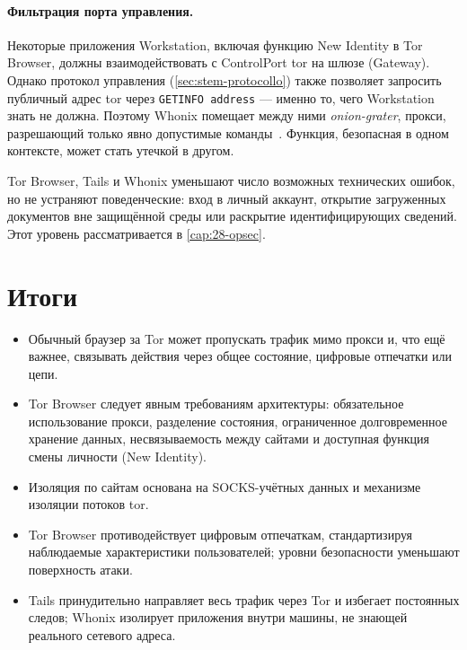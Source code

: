 \paragraph{Фильтрация порта управления.} Некоторые приложения Workstation, включая функцию New Identity в Tor Browser, должны взаимодействовать с ControlPort tor на шлюзе (Gateway). Однако протокол управления (\cref{sec:stem-protocollo}) также позволяет запросить публичный адрес tor через \texttt{GETINFO address} — именно то, чего Workstation знать не должна. Поэтому Whonix помещает между ними \emph{onion-grater}, прокси, разрешающий только явно допустимые команды~\cite{whonixgrater}. Функция, безопасная в одном контексте, может стать утечкой в другом.

\begin{attenzione}
Tor Browser, Tails и Whonix уменьшают число возможных технических ошибок, но не устраняют поведенческие: вход в личный аккаунт, открытие загруженных документов вне защищённой среды или раскрытие идентифицирующих сведений. Этот уровень рассматривается в \cref{cap:28-opsec}.
\end{attenzione}

\section*{Итоги}
\begin{itemize}
  \item Обычный браузер за Tor может пропускать трафик мимо прокси и, что ещё важнее, связывать действия через общее состояние, цифровые отпечатки или цепи.
  \item Tor Browser следует явным требованиям архитектуры: обязательное использование прокси, разделение состояния, ограниченное долговременное хранение данных, несвязываемость между сайтами и доступная функция смены личности (New Identity).
  \item Изоляция по сайтам основана на SOCKS-учётных данных и механизме изоляции потоков tor.
  \item Tor Browser противодействует цифровым отпечаткам, стандартизируя наблюдаемые характеристики пользователей; уровни безопасности уменьшают поверхность атаки.
  \item Tails принудительно направляет весь трафик через Tor и избегает постоянных следов; Whonix изолирует приложения внутри машины, не знающей реального сетевого адреса.
\end{itemize}

